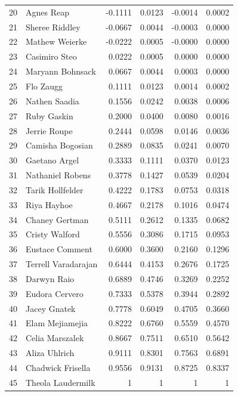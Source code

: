 {\begin{longtable}{@{}r l r r r r@{}}
20 & Agnes Reap & -0.1111 & 0.0123 & -0.0014 & 0.0002 \\
21 & Sheree Riddley & -0.0667 & 0.0044 & -0.0003 & 0.0000 \\
22 & Mathew Weierke & -0.0222 & 0.0005 & -0.0000 & 0.0000 \\
23 & Casimiro Steo & 0.0222 & 0.0005 & 0.0000 & 0.0000 \\
24 & Maryann Bohnsack & 0.0667 & 0.0044 & 0.0003 & 0.0000 \\
25 & Flo Zaugg & 0.1111 & 0.0123 & 0.0014 & 0.0002 \\
26 & Nathen Saadia & 0.1556 & 0.0242 & 0.0038 & 0.0006 \\
27 & Ruby Gaskin & 0.2000 & 0.0400 & 0.0080 & 0.0016 \\
28 & Jerrie Roupe & 0.2444 & 0.0598 & 0.0146 & 0.0036 \\
29 & Camisha Bogosian & 0.2889 & 0.0835 & 0.0241 & 0.0070 \\
30 & Gaetano Argel & 0.3333 & 0.1111 & 0.0370 & 0.0123 \\
31 & Nathaniel Robens & 0.3778 & 0.1427 & 0.0539 & 0.0204 \\
32 & Tarik Hollfelder & 0.4222 & 0.1783 & 0.0753 & 0.0318 \\
33 & Riya Hayhoe & 0.4667 & 0.2178 & 0.1016 & 0.0474 \\
34 & Chaney Gertman & 0.5111 & 0.2612 & 0.1335 & 0.0682 \\
35 & Cristy Walford & 0.5556 & 0.3086 & 0.1715 & 0.0953 \\
36 & Eustace Comment & 0.6000 & 0.3600 & 0.2160 & 0.1296 \\
37 & Terrell Varadarajan & 0.6444 & 0.4153 & 0.2676 & 0.1725 \\
38 & Darwyn Raio & 0.6889 & 0.4746 & 0.3269 & 0.2252 \\
39 & Eudora Cervero & 0.7333 & 0.5378 & 0.3944 & 0.2892 \\
40 & Jacey Gnatek & 0.7778 & 0.6049 & 0.4705 & 0.3660 \\
41 & Elam Mejiamejia & 0.8222 & 0.6760 & 0.5559 & 0.4570 \\
42 & Celia Marszalek & 0.8667 & 0.7511 & 0.6510 & 0.5642 \\
43 & Aliza Uhlrich & 0.9111 & 0.8301 & 0.7563 & 0.6891 \\
44 & Chadwick Frisella & 0.9556 & 0.9131 & 0.8725 & 0.8337 \\
45 & Theola Laudermilk & 1 & 1 & 1 & 1 \\
\bottomrule
\end{longtable}
}

